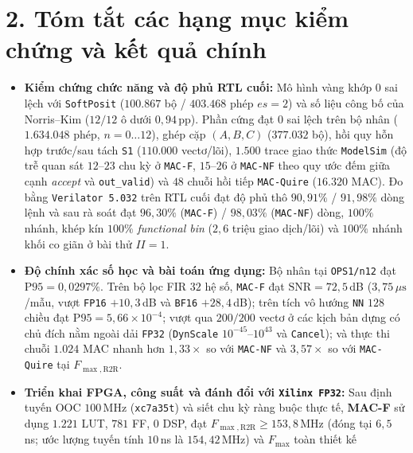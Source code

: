 \section*{2. Tóm tắt các hạng mục kiểm chứng và kết quả chính}
\begin{itemize}
  \item \textbf{Kiểm chứng chức năng và độ phủ RTL cuối:} Mô hình vàng khớp $0$
        sai lệch với \texttt{SoftPosit} ($100.867$ bộ / $403.468$ phép $es=2$) và
        số liệu công bố của Norris--Kim ($12/12$ ô dưới $0{,}94$\,pp). Phần cứng đạt
        $0$ sai lệch trên bộ nhân ($1.634.048$ phép, $n=0\dots 12$), ghép cặp
        $(A,B,C)$ ($377.032$ bộ), hồi quy hỗn hợp trước/sau tách \texttt{S1}
        ($110.000$ vectơ/lõi), $1.500$ trace giao thức \texttt{ModelSim} (độ trễ
        quan sát $12\text{--}23$ chu kỳ ở \texttt{MAC-F}, $15\text{--}26$ ở
        \texttt{MAC-NF} theo quy ước đếm giữa cạnh \textit{accept} và
        \texttt{out\_valid}) và $48$ chuỗi hồi tiếp \texttt{MAC-Quire} ($16.320$
        MAC). Đo bằng \texttt{Verilator 5.032} trên RTL cuối đạt độ phủ thô
        $90{,}91\%$ / $91{,}98\%$ dòng lệnh và sau rà soát đạt $96{,}30\%$
        (\texttt{MAC-F}) / $98{,}03\%$ (\texttt{MAC-NF}) dòng, $100\%$ nhánh,
        khép kín $100\%$ \textit{functional bin} ($2{,}6$ triệu giao dịch/lõi) và
        $100\%$ nhánh khối co giãn ở bài thử $II=1$.
  \item \textbf{Độ chính xác số học và bài toán ứng dụng:} Bộ nhân tại
        \texttt{OPS1/n12} đạt $\mathrm{P95}=0{,}0297\%$. Trên bộ lọc FIR $32$ hệ
        số, \texttt{MAC-F} đạt $\mathrm{SNR}=72{,}5$\,dB ($3{,}75\,\mu\text{s}$/mẫu,
        vượt \texttt{FP16} $+10{,}3$\,dB và \texttt{BF16} $+28{,}4$\,dB); trên tích
        vô hướng \texttt{NN} $128$ chiều đạt $\mathrm{P95}=5{,}66{\times}10^{-4}$;
        vượt qua $200/200$ vectơ ở các kịch bản dựng có chủ đích nằm ngoài dải
        \texttt{FP32} (\texttt{DynScale} $10^{-45}\text{--}10^{43}$ và \texttt{Cancel});
        và thực thi chuỗi $1.024$ MAC nhanh hơn $1{,}33\times$ so với
        \texttt{MAC-NF} và $3{,}57\times$ so với \texttt{MAC-Quire} tại
        $F_{\max,\mathrm{R2R}}$.
  \item \textbf{Triển khai FPGA, công suất và đánh đổi với \texttt{Xilinx FP32}:}
        Sau định tuyến OOC $100$\,MHz (\texttt{xc7a35t}) và siết chu kỳ ràng buộc
        thực tế, \textbf{MAC-F} sử dụng $1.221$ LUT, $781$ FF, $0$ DSP, đạt
        $F_{\max,\mathrm{R2R}} \ge 153{,}8$\,MHz (đóng tại $6{,}5$\,ns; ước lượng
        tuyến tính $10$\,ns là $154{,}42$\,MHz) và $F_{\max}$ toàn thiết kế

\end{itemize}
